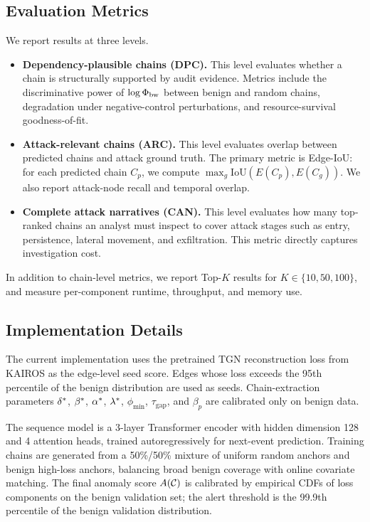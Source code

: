 \subsection{Evaluation Metrics}
\label{sec:eval:metrics}

We report results at three levels.
\begin{itemize}
\item \textbf{Dependency-plausible chains (DPC).} This level evaluates whether a chain is structurally supported by audit evidence. Metrics include the discriminative power of $\log\Phi_{\text{bw}}$ between benign and random chains, degradation under negative-control perturbations, and resource-survival goodness-of-fit.
\item \textbf{Attack-relevant chains (ARC).} This level evaluates overlap between predicted chains and attack ground truth. The primary metric is Edge-IoU: for each predicted chain $C_p$, we compute $\max_g \mathrm{IoU}(E(C_p),E(C_g))$. We also report attack-node recall and temporal overlap.
\item \textbf{Complete attack narratives (CAN).} This level evaluates how many top-ranked chains an analyst must inspect to cover attack stages such as entry, persistence, lateral movement, and exfiltration. This metric directly captures investigation cost.
\end{itemize}

In addition to chain-level metrics, we report Top-$K$ results for $K\in\{10,50,100\}$, and measure per-component runtime, throughput, and memory use.

\subsection{Implementation Details}

The current implementation uses the pretrained TGN reconstruction loss from KAIROS as the edge-level seed score. Edges whose loss exceeds the 95th percentile of the benign distribution are used as seeds. Chain-extraction parameters $\delta^*$, $\beta^*$, $\alpha^*$, $\lambda^*$, $\phi_{\min}$, $\tau_{\text{gap}}$, and $\beta_p$ are calibrated only on benign data.

The sequence model is a 3-layer Transformer encoder with hidden dimension 128 and 4 attention heads, trained autoregressively for next-event prediction. Training chains are generated from a 50\%/50\% mixture of uniform random anchors and benign high-loss anchors, balancing broad benign coverage with online covariate matching. The final anomaly score $A(\mathcal{C})$ is calibrated by empirical CDFs of loss components on the benign validation set; the alert threshold is the 99.9th percentile of the benign validation distribution.
